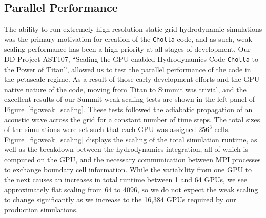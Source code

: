 \documentclass[11pt,letterpaper,english]{article}
\begin{document}
\vspace{-.25in}
\subsection{Parallel Performance}
\vspace{-.2in}





The ability to run extremely high resolution static grid hydrodynamic simulations was the primary motivation for creation of the {\tt Cholla} code, and as such, weak scaling performance has been a high priority at all stages of development. Our DD Project AST107, ``Scaling the GPU-enabled Hydrodynamics Code {\tt Cholla} to the Power of Titan'', allowed us to test the parallel performance of the code in the petascale regime. As a result of those early development efforts and the GPU-native nature of the code, moving from Titan to Summit was trivial, and the excellent results of our Summit weak scaling tests are shown in the left panel of Figure~\ref{fig:weak_scaling}. These tests followed the adiabatic propagation of an acoustic wave across the grid for a constant number of time steps. The total sizes of the simulations were set such that each GPU was assigned $256^3$ cells. Figure~\ref{fig:weak_scaling} displays the scaling of the total simulation runtime, as well as the breakdown between the hydrodynamics integration, all of which is computed on the GPU, and the necessary communication between MPI processes to exchange boundary cell information. While the variability from one GPU to the next causes an increases in total runtime between 1 and 64 GPUs, we see approximately flat scaling from 64 to 4096, so we do not expect the weak scaling to change significantly as we increase to the 16,384 GPUs required by our production simulations.
\end{document}
